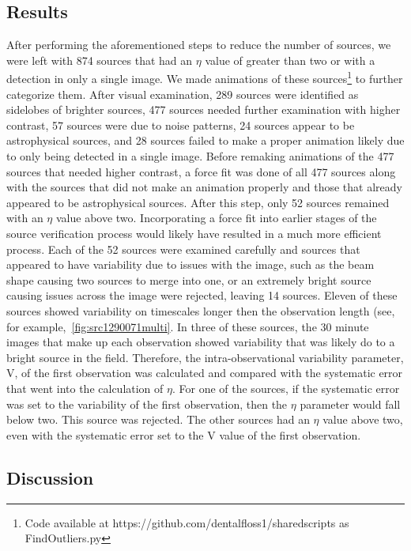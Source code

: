 \documentclass[12pt]{article}
\begin{document}
\subsection{Results}
\label{sec:results3}
After performing the aforementioned steps to reduce the number of sources, we were left with 874 sources that had an $\eta$ value of greater than two or with a detection in only a single image. We made animations of these sources\footnote{Code available at https://github.com/dentalfloss1/sharedscripts as FindOutliers.py} to further categorize them. After visual examination, 289 sources were identified as sidelobes of brighter sources, 477 sources needed further examination with higher contrast, 57 sources were due to noise patterns, 24 sources appear to be astrophysical sources, and 28 sources failed to make a proper animation likely due to only being detected in a single image. Before remaking animations of the 477 sources that needed higher contrast, a force fit was done of all 477 sources along with the sources that did not make an animation properly and those that already appeared to be astrophysical sources. After this step, only 52 sources remained with an $\eta$ value above two. Incorporating a force fit into earlier stages of the source verification process would likely have resulted in a much more efficient process. Each of the 52 sources were examined carefully and sources that appeared to have variability due to issues with the image, such as the beam shape causing two sources to merge into one, or an extremely bright source causing issues across the image were rejected, leaving 14 sources. Eleven of these sources showed variability on timescales longer then the observation length (see, for example,~\ref{fig:src1290071multi}. In three of these sources, the 30 minute images that make up each observation showed variability that was likely do to a bright source in the field. Therefore, the intra-observational variability parameter, V, of the first observation was calculated and compared with the systematic error that went into the calculation of $\eta$. For one of the sources, if the systematic error was set to the variability of the first observation, then the $\eta$ parameter would fall below two. This source was rejected. The other sources had an $\eta$ value above two, even with the systematic error set to the V value of the first observation.



\subsection{Discussion}
\label{sec:discussion3}
\end{document}
